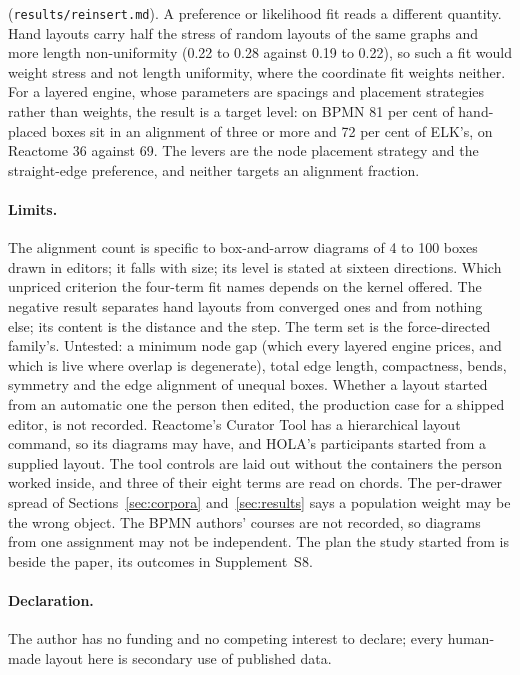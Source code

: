 \documentclass[11pt]{article}
\begin{document}
(\texttt{results/reinsert.md}). A preference or likelihood fit reads a different quantity.
Hand layouts carry half the stress of random layouts of the same graphs and
more length non-uniformity (0.22 to 0.28 against 0.19 to 0.22), so such a fit would
weight stress and not length uniformity, where the coordinate fit weights neither. For a
layered engine, whose parameters are spacings and placement strategies rather than
weights, the result is a target level: on BPMN 81 per cent of hand-placed boxes sit in an
alignment of three or more and 72 per cent of ELK's, on Reactome 36 against 69. The levers
are the node placement strategy and the straight-edge preference, and neither targets an
alignment fraction.

\paragraph{Limits.} The alignment count is specific to box-and-arrow diagrams of 4 to 100
boxes drawn in editors; it falls with size; its level is stated at sixteen directions.
Which unpriced criterion the four-term fit names depends on the kernel offered. The
negative result separates hand layouts from converged ones and from nothing else; its
content is the distance and the step. The term set is the force-directed family's.
Untested: a minimum node gap (which every layered engine prices, and which is live where
overlap is degenerate), total edge length, compactness, bends, symmetry and the edge
alignment of unequal boxes. Whether a layout started from an automatic one the person then
edited, the production case for a shipped editor, is not recorded. Reactome's Curator Tool
has a hierarchical layout command, so its diagrams may have, and HOLA's participants
started from a supplied layout. The tool controls are laid out without the containers the
person worked inside, and three of their eight terms are read on chords. The per-drawer spread of Sections~\ref{sec:corpora} and~\ref{sec:results} says a
population weight may be the wrong object. The BPMN authors' courses are not recorded, so
diagrams from one assignment may not be independent. The plan the study started from is
beside the paper, its outcomes in Supplement~S8.

\paragraph{Declaration.} The author has no funding and no competing interest to declare;
every human-made layout here is secondary use of published data.
\end{document}
